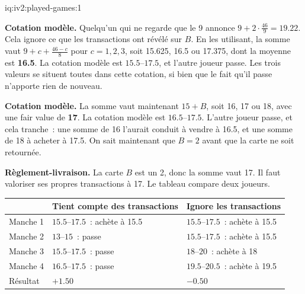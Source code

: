 \begin{solution}{iq:iv2:played-games:1}
\ivstop

\textbf{Cotation modèle.} Quelqu'un qui ne regarde que le 9 annonce $9 + 2 \cdot \frac{46}{9} = 19.22$. Cela ignore ce que les transactions ont révélé sur $B$. En les utilisant, la somme vaut $9 + c + \frac{46 - c}{8}$ pour $c = 1, 2, 3$, soit 15.625, 16.5 ou 17.375, dont la moyenne est \textbf{16.5}. La cotation modèle est $15.5$--$17.5$, et l'autre joueur passe. Les trois valeurs se situent toutes dans cette cotation, si bien que le fait qu'il passe n'apporte rien de nouveau.

\ivstop

\textbf{Cotation modèle.} La somme vaut maintenant $15 + B$, soit 16, 17 ou 18, avec une fair value de \textbf{17}. La cotation modèle est $16.5$--$17.5$. L'autre joueur passe, et cela tranche~: une somme de 16 l'aurait conduit à vendre à 16.5, et une somme de 18 à acheter à 17.5. On sait maintenant que $B = 2$ avant que la carte ne soit retournée.

\medskip
\textbf{Règlement-livraison.} La carte $B$ est un 2, donc la somme vaut 17. Il faut valoriser ses propres transactions à 17. Le tableau compare deux joueurs.
\begin{center}\small
\begin{tabular}{@{}lll@{}}
 & Tient compte des transactions & Ignore les transactions \\ \hline
Manche 1 & $15.5$--$17.5$~: achète à 15.5 & $15.5$--$17.5$~: achète à 15.5 \\
Manche 2 & $13$--$15$~: passe & $15.5$--$17.5$~: achète à 15.5 \\
Manche 3 & $15.5$--$17.5$~: passe & $18$--$20$~: achète à 18 \\
Manche 4 & $16.5$--$17.5$~: passe & $19.5$--$20.5$~: achète à 19.5 \\ \hline
Résultat & $+1.50$ & $-0.50$
\end{tabular}
\end{center}


\end{solution}
